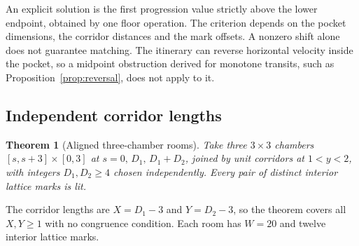\documentclass[11pt]{article}
\newtheorem{theorem}{Theorem}
\theoremstyle{definition}
\theoremstyle{remark}
\begin{document}
An explicit solution is the first progression value strictly above the lower
endpoint, obtained by one floor operation. The criterion depends on the pocket
dimensions, the corridor distances and the mark offsets. A nonzero shift alone
does not guarantee matching. The itinerary can reverse horizontal velocity inside
the pocket, so a midpoint obstruction derived for monotone transits, such as
Proposition~\ref{prop:reversal}, does not apply to it.

\subsection{Independent corridor lengths}
\begin{theorem}[Aligned three-chamber rooms]\label{thm:unequal}
Take three $3\times 3$ chambers $[s,s+3]\times[0,3]$ at $s=0,\,D_1,\,D_1+D_2$,
joined by unit corridors at $1<y<2$, with integers $D_1,D_2\ge 4$ chosen
independently. Every pair of distinct interior lattice marks is lit.
\end{theorem}

The corridor lengths are $X=D_1-3$ and $Y=D_2-3$, so the theorem covers all
$X,Y\ge 1$ with no congruence condition. Each room has $W=20$ and twelve
interior lattice marks.
\end{document}

